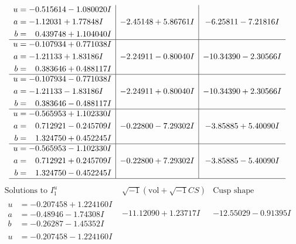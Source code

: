 \documentclass[1p]{elsarticle_modified}
\theoremstyle{definition}
\newcommand{\I}{\sqrt{-1}}
\begin{document}
$$\begin{array}{c|c|c}
\begin{aligned}
u &= -0.515614 - 1.080020 I \\
a &= -1.12031 + 1.77848 I \\
b &= \phantom{-}0.439748 + 1.104040 I\end{aligned}
 & -2.45148 + 5.86761 I & -6.25811 - 7.21816 I \\ \hline\begin{aligned}
u &= -0.107934 + 0.771038 I \\
a &= -1.21133 + 1.83186 I \\
b &= \phantom{-}0.383646 + 0.488117 I\end{aligned}
 & -2.24911 - 0.80040 I & -10.34390 - 2.30566 I \\ \hline\begin{aligned}
u &= -0.107934 - 0.771038 I \\
a &= -1.21133 - 1.83186 I \\
b &= \phantom{-}0.383646 - 0.488117 I\end{aligned}
 & -2.24911 + 0.80040 I & -10.34390 + 2.30566 I \\ \hline\begin{aligned}
u &= -0.565953 + 1.102330 I \\
a &= \phantom{-}0.712921 - 0.245709 I \\
b &= \phantom{-}1.324750 + 0.452245 I\end{aligned}
 & -0.22800 - 7.29302 I & -3.85885 + 5.40090 I \\ \hline\begin{aligned}
u &= -0.565953 - 1.102330 I \\
a &= \phantom{-}0.712921 + 0.245709 I \\
b &= \phantom{-}1.324750 - 0.452245 I\end{aligned}
 & -0.22800 + 7.29302 I & -3.85885 - 5.40090 I\\
 \hline 
 \end{array}$$\newpage$$\begin{array}{c|c|c}  
\text{Solutions to }I^u_{1}& \I (\text{vol} + \sqrt{-1}CS) & \text{Cusp shape}\\
 \hline 
\begin{aligned}
u &= -0.207458 + 1.224160 I \\
a &= -0.48946 - 1.74308 I \\
b &= -0.26287 - 1.45352 I\end{aligned}
 & -11.12090 + 1.23717 I & -12.55029 - 0.91395 I \\ \hline\begin{aligned}
u &= -0.207458 - 1.224160 I \\

\end{aligned}
\end{array}$$
\end{document}
